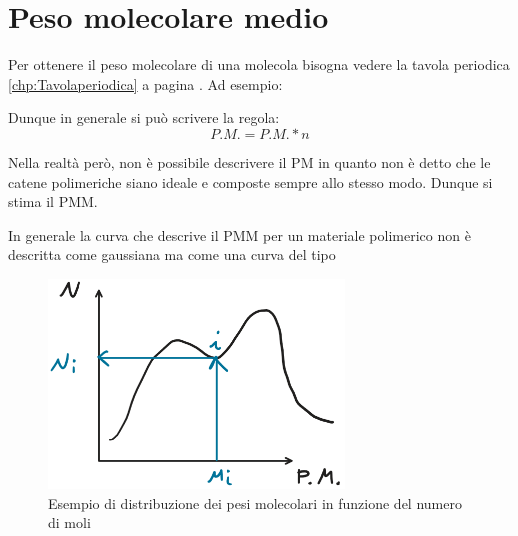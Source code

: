 \chapter{Peso molecolare medio}\label{chp:PM}
Per ottenere il peso molecolare di una molecola bisogna vedere la tavola periodica \ref{chp:Tavolaperiodica} a pagina \pageref{chp:Tavolaperiodica}.
Ad esempio:

\begin{figure}
\centering
{}\quad
{}
\end{figure}

Dunque in generale si può scrivere la regola:
\begin{equation}
P.M. = P.M. * n
\label{eqn:PM}
\end{equation}

Nella realtà però, non è possibile descrivere il \ac{PM} in quanto non è detto che le catene polimeriche siano ideale e composte sempre allo stesso modo.
Dunque si stima il \ac{PMM}.

In generale la curva che descrive il \ac{PMM} per un materiale polimerico non è descritta come gaussiana ma come una curva del tipo

\begin{figure}
\centering
\includegraphics[width = 0.7\textwidth]{gfx/PM}
\caption{Esempio di distribuzione dei pesi molecolari in funzione del numero di moli}
\label{fig:PM}
\end{figure}

